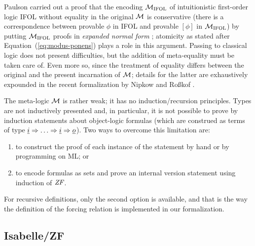 Paulson  \cite{Paulson1989} carried out a proof that the encoding
$\mathcal{M}_{\mathrm{IFOL}}$ of
intuitionistic first-order logic IFOL without equality  in the original $\mathcal{M}$ is
conservative (there is a correspondence between provable $\phi$ in
IFOL and provable $[\phi]$ in $\mathcal{M}_{\mathrm{IFOL}}$) by putting
$\mathcal{M}_{\mathrm{IFOL}}$ proofs in \emph{expanded normal form}
\cite{MR0387024}; atomicity as stated after
Equation~(\ref{eq:modus-ponens}) plays a role in this argument. Passing to classical logic does not present
difficulties, but the addition of meta-equality must be taken care of.
Even more so, since the treatment of equality differs between the
original and the present incarnation of $\mathcal{M}$; details for the
latter are exhaustively expounded in the recent formalization by
Nipkow and Roßkof \cite{10.1007/978-3-030-79876-5_6}.

The meta-logic $\mathcal{M}$ is rather weak; it has no induction/recursion
principles. Types are not inductively presented and, in particular, it
is not possible to prove by induction statements about
object-logic formulas (which are construed as terms of type $\tyi \fun
\dots \fun \tyi \fun \tyo$). Two ways to overcome this limitation are:
\begin{enumerate}
\item
  to construct the
  proof of each instance of the statement by hand or by programming on
  ML; or 
\item
  to encode formulas as sets and prove an internal version statement
  using induction of $\mathit{ZF}$.
\end{enumerate}

For recursive definitions, only the second option is available, and
that is the way the definition of the forcing relation is implemented
in our formalization.

\subsection{Isabelle/ZF}
\label{sec:isabellezf}

